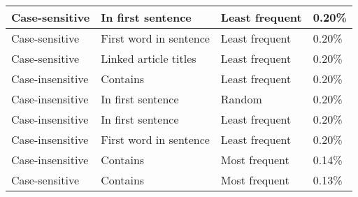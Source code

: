 \begin{center}
\begin{table}[h]
\begin{tabular}{llll}
Case-sensitive       & In first sentence      & Least frequent              & 0.20\%             \\ \hline
Case-sensitive       & First word in sentence & Least frequent              & 0.20\%             \\ \hline
Case-sensitive       & Linked article titles  & Least frequent              & 0.20\%             \\ \hline
Case-insensitive     & Contains               & Least frequent              & 0.20\%             \\ \hline
Case-insensitive     & In first sentence      & Random                      & 0.20\%             \\ \hline
Case-insensitive     & In first sentence      & Least frequent              & 0.20\%             \\ \hline
Case-insensitive     & First word in sentence & Least frequent              & 0.20\%             \\ \hline
Case-insensitive     & Contains               & Most frequent               & 0.14\%             \\ \hline
Case-sensitive       & Contains               & Most frequent               & 0.13\%             \\ \hline
\end{tabular}
\end{table}
\end{center}%





